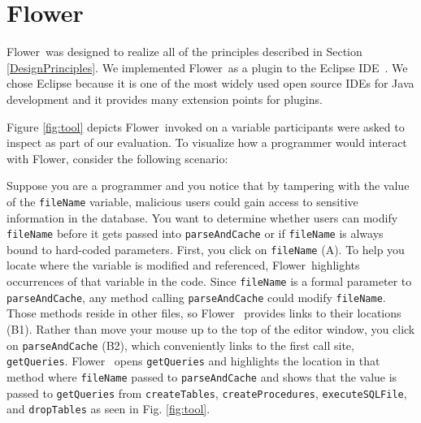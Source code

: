 \documentclass[conference]{IEEEtran}
\newcommand{\toolName}{Flower}
\begin{document}
\section{\toolName}
\toolName~was designed to realize all of the principles described in Section \ref{DesignPrinciples}. 
We implemented \toolName~as a plugin to the Eclipse IDE~\cite{Eclipse}. 
We chose Eclipse because it is one of the most widely used open source IDEs for Java development and it provides many extension points for plugins. 

Figure \ref{fig:tool} depicts \toolName~invoked on a variable participants were asked to inspect as part of our evaluation. To visualize how a programmer would interact with \toolName, consider the following scenario:


Suppose you are a programmer and you notice that by tampering with the value of the \texttt{fileName} variable, malicious users could gain access to sensitive information in the database. 
You want to determine whether users can modify \texttt{fileName} before it gets passed into \texttt{parseAndCache} or if \texttt{fileName} is always bound to hard-coded parameters. 
First, you click on \texttt{fileName} (A). 
To help you locate where the variable is modified and referenced, \toolName~highlights occurrences of that variable in the code.
Since \texttt{fileName} is a formal parameter to \texttt{parseAndCache}, any method calling \texttt{parseAndCache} could modify \texttt{fileName}. 
Those methods reside in other files, so \toolName~ provides links to their locations (B1).
Rather than move your mouse up to the top of the editor window, you click on \texttt{parseAndCache} (B2), which conveniently links to the first call site, \texttt{getQueries}. 
\toolName~ opens \texttt{getQueries} and highlights the location in that method where \texttt{fileName} passed to \texttt{parseAndCache} and shows that the value is passed to \texttt{getQueries} from \texttt{createTables}, \texttt{createProcedures}, \texttt{executeSQLFile}, and \texttt{dropTables} as seen in Fig. \ref{fig:tool}.  

\end{document}
